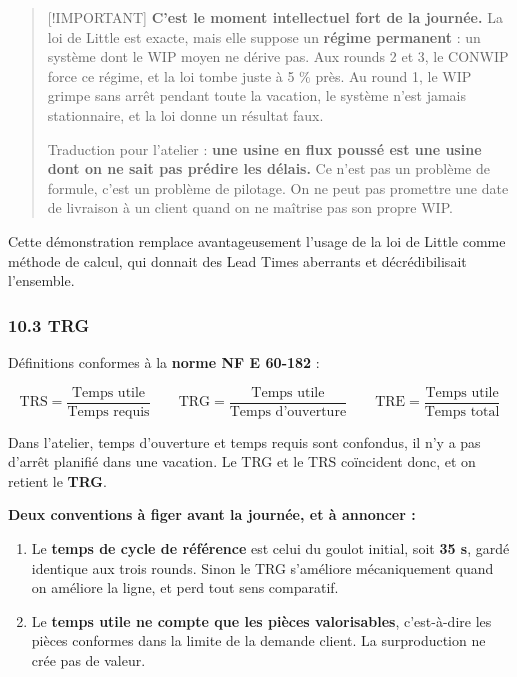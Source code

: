 \documentclass[
]{article}
\providecommand{\tightlist}{%
  \setlength{\itemsep}{0pt}\setlength{\parskip}{0pt}}
\begin{document}
\begin{quote}
{[}!IMPORTANT{]} \textbf{C'est le moment intellectuel fort de la
journée.} La loi de Little est exacte, mais elle suppose un
\textbf{régime permanent} : un système dont le WIP moyen ne dérive pas.
Aux rounds 2 et 3, le CONWIP force ce régime, et la loi tombe juste à 5
\% près. Au round 1, le WIP grimpe sans arrêt pendant toute la vacation,
le système n'est jamais stationnaire, et la loi donne un résultat faux.

Traduction pour l'atelier : \textbf{une usine en flux poussé est une
usine dont on ne sait pas prédire les délais.} Ce n'est pas un problème
de formule, c'est un problème de pilotage. On ne peut pas promettre une
date de livraison à un client quand on ne maîtrise pas son propre WIP.
\end{quote}

Cette démonstration remplace avantageusement l'usage de la loi de Little
comme méthode de calcul, qui donnait des Lead Times aberrants et
décrédibilisait l'ensemble.

\subsubsection{10.3 TRG}\label{trg}

Définitions conformes à la \textbf{norme NF E 60-182} :

\[
\text{TRS} = \frac{\text{Temps utile}}{\text{Temps requis}}
\qquad
\text{TRG} = \frac{\text{Temps utile}}{\text{Temps d'ouverture}}
\qquad
\text{TRE} = \frac{\text{Temps utile}}{\text{Temps total}}
\]

Dans l'atelier, temps d'ouverture et temps requis sont confondus, il n'y
a pas d'arrêt planifié dans une vacation. Le TRG et le TRS coïncident
donc, et on retient le \textbf{TRG}.

\textbf{Deux conventions à figer avant la journée, et à annoncer :}

\begin{enumerate}
\def\labelenumi{\arabic{enumi}.}
\tightlist
\item
  Le \textbf{temps de cycle de référence} est celui du goulot initial,
  soit \textbf{35 s}, gardé identique aux trois rounds. Sinon le TRG
  s'améliore mécaniquement quand on améliore la ligne, et perd tout sens
  comparatif.
\item
  Le \textbf{temps utile ne compte que les pièces valorisables},
  c'est-à-dire les pièces conformes dans la limite de la demande client.
  La surproduction ne crée pas de valeur.
\end{enumerate}
\end{document}

